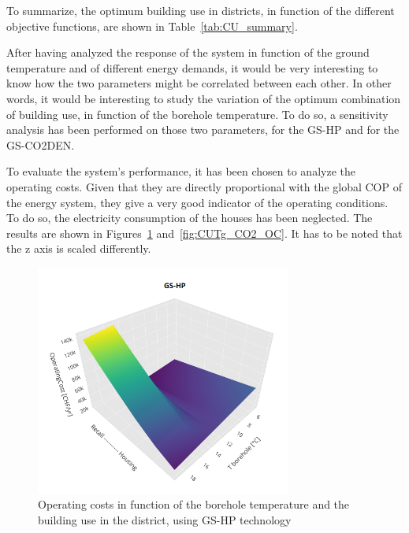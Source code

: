 \documentclass{article}
\begin{document}


To summarize, the optimum building use in districts, in function of the different objective functions, are shown in Table~\ref{tab:CU_summary}.



After having analyzed the response of the system in function of the ground temperature and of different energy demands, it would be very interesting to know how the two parameters might be correlated between each other. In other words, it would be interesting to study the variation of the optimum combination of building use, in function of the borehole temperature. 
To do so, a sensitivity analysis has been performed on those two parameters, for the GS-HP and for the GS-CO2DEN. 

To evaluate the system's performance, it has been chosen to analyze the operating costs. Given that they are directly proportional with the global COP of the energy system, they give a very good indicator of the operating conditions. To do so, the electricity consumption of the houses has been neglected. The results are shown in Figures~\ref{fig:CUTg_OC} and~\ref{fig:CUTg_CO2_OC}. It has to be noted that the z axis is scaled differently.\\

\begin{figure}[htp]
	\centering
	\includegraphics[width=0.75\textwidth]{CUTg_SA_OC.png}
	\caption{Operating costs in function of the borehole temperature and the building use in the district, using GS-HP technology}
	\label{fig:CUTg_OC}
\end{figure}
\end{document}
